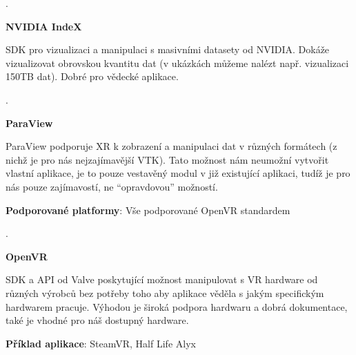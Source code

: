 \documentclass[czech]{article}
\newcounter{variantcounter}
\newenvironment{variant}
{
    \vspace{0pt}
    \ifdim\pagetotal>\dimexpr\textheight-5\baselineskip\relax
        \newpage
    \fi
    \begingroup
    \addtocounter{variantcounter}{1}
    \thevariantcounter{}.
}
{
    \endgroup
}
\begin{document}
\begin{variant}
	\textbf{NVIDIA IndeX}
		
	SDK pro vizualizaci a manipulaci s masivními datasety od NVIDIA. Dokáže vizualizovat obrovskou kvantitu dat (v ukázkách můžeme nalézt např. vizualizaci 150TB dat). Dobré pro vědecké aplikace.
\end{variant}



\begin{variant}
	\textbf{ParaView}
		
	ParaView podporuje XR k zobrazení a manipulaci dat v různých formátech (z nichž je pro nás nejzajímavější VTK). Tato možnost nám neumožní vytvořit vlastní aplikace, je to pouze vestavěný modul v již existující aplikaci, tudíž je pro nás pouze zajímavostí, ne \enquote{opravdovou} možností.
		
	\textbf{Podporované platformy}: Vše podporované OpenVR standardem
\end{variant}


\begin{variant}
	\textbf{OpenVR}
		
	SDK a API od Valve poskytující možnost manipulovat s VR hardware od různých 	výrobců bez potřeby toho aby aplikace věděla s jakým specifickým hardwarem pracuje. Výhodou je široká podpora hardwaru a dobrá dokumentace, také je vhodné pro náš dostupný hardware.
		
	\textbf{Příklad aplikace}: SteamVR, Half Life Alyx
\end{variant}
\end{document}
